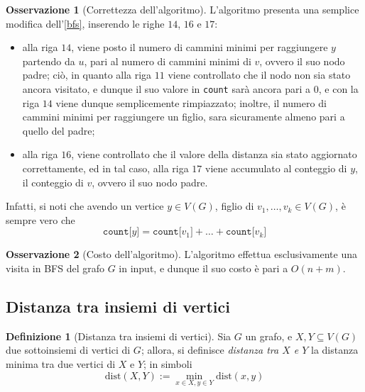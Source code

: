 \documentclass[14pt]{extreport}
\theoremstyle{definition}
\newtheorem{definition}{Definizione}[subsection]
\theoremstyle{definition}
\newtheorem{remark}{Osservazione}[subsection]
\begin{document}
\begin{remark}[Correttezza dell'algoritmo]
    L'algoritmo presenta una semplice modifica dell'\cref{bfs}, inserendo le righe $14$, $16$ e $17$:

    \begin{itemize}
        \item alla riga $14$, viene posto il numero di cammini minimi per raggiungere $y$ partendo da $u$, pari al numero di cammini minimi di $v$, ovvero il suo nodo padre; ciò, in quanto alla riga $11$ viene controllato che il nodo non sia stato ancora visitato, e dunque il suo valore in \texttt{count} sarà ancora pari a $0$, e con la riga $14$ viene dunque semplicemente rimpiazzato; inoltre, il numero di cammini minimi per raggiungere un figlio, sara sicuramente almeno pari a quello del padre;
        \item alla riga $16$, viene controllato che il valore della distanza sia stato aggiornato correttamente, ed in tal caso, alla riga $17$ viene accumulato al conteggio di $y$, il conteggio di $v$, ovvero il suo nodo padre.
    \end{itemize}

    Infatti, si noti che avendo un vertice $y \in V(G)$, figlio di $v_1, \ldots, v_k \in V(G)$, è sempre vero che $$\texttt{count[}y\texttt{]} = \texttt{count[}v_1\texttt{]} + \ldots + \texttt{count[}v_k\texttt{]}$$
\end{remark}

\begin{remark}[Costo dell'algoritmo]
    L'algoritmo effettua esclusivamente una visita in BFS del grafo $G$ in input, e dunque il suo costo è pari a $O(n+m)$.
\end{remark}

\subsection{Distanza tra insiemi di vertici}

\begin{definition}[Distanza tra insiemi di vertici]
    Sia $G$ un grafo, e $X, Y \subseteq V(G)$ due sottoinsiemi di vertici di $G$; allora, si definisce \textit{distanza tra $X$ e $Y$} la distanza minima tra due vertici di $X$ e $Y$; in simboli $$\mathrm{dist}(X, Y) := \min_{x \in X, y \in Y}{\mathrm{dist}(x, y)}$$
\end{definition}
\end{document}
